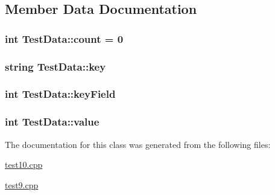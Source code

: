 \subsection{\-Member \-Data \-Documentation}
\hypertarget{class_test_data_a9209c5345dda5dcb483b9c972fafc495}{
\subsubsection[{count}]{\setlength{\rightskip}{0pt plus 5cm}int {\bf \-Test\-Data\-::count} = 0}}\label{class_test_data_a9209c5345dda5dcb483b9c972fafc495}
\hypertarget{class_test_data_a16fe3a9a89c54e55fc56ae88590ae0c8}{
\subsubsection[{key}]{\setlength{\rightskip}{0pt plus 5cm}string {\bf \-Test\-Data\-::key}}}\label{class_test_data_a16fe3a9a89c54e55fc56ae88590ae0c8}
\hypertarget{class_test_data_adafb60a315eaa088791c9e40f4a2618f}{
\subsubsection[{key\-Field}]{\setlength{\rightskip}{0pt plus 5cm}int {\bf \-Test\-Data\-::key\-Field}}}\label{class_test_data_adafb60a315eaa088791c9e40f4a2618f}
\hypertarget{class_test_data_a8291f6b900b25a926deb1b2a393dc0ff}{
\subsubsection[{value}]{\setlength{\rightskip}{0pt plus 5cm}int {\bf \-Test\-Data\-::value}}}\label{class_test_data_a8291f6b900b25a926deb1b2a393dc0ff}


\-The documentation for this class was generated from the following files\-:\begin{DoxyCompactItemize}
\item 
\hyperlink{test10_8cpp}{test10.\-cpp}\item 
\hyperlink{test9_8cpp}{test9.\-cpp}\end{DoxyCompactItemize}
